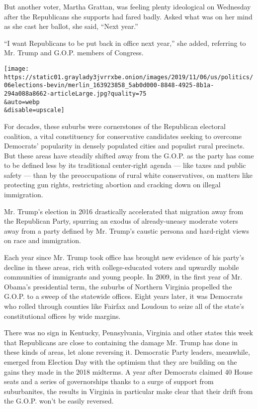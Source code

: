 But another voter, Martha Grattan, was feeling plenty ideological on
Wednesday after the Republicans she supports had fared badly. Asked what
was on her mind as she cast her ballot, she said, ``Next year.''

``I want Republicans to be put back in office next year,'' she added,
referring to Mr. Trump and G.O.P. members of Congress.

\texttt{[image: https://static01.graylady3jvrrxbe.onion/images/2019/11/06/us/politics/06elections-bevin/merlin\_163923858\_5ab0d000-8848-4925-8b1a-294a088a8662-articleLarge.jpg?quality=75\\\&auto=webp\\\&disable=upscale]}

For decades, these suburbs were cornerstones of the Republican electoral
coalition, a vital constituency for conservative candidates seeking to
overcome Democrats' popularity in densely populated cities and populist
rural precincts. But these areas have steadily shifted away from the
G.O.P. as the party has come to be defined less by its traditional
center-right agenda --- like taxes and public safety --- than by the
preoccupations of rural white conservatives, on matters like protecting
gun rights, restricting abortion and cracking down on illegal
immigration.

Mr. Trump's election in 2016 drastically accelerated that migration away
from the Republican Party, spurring an exodus of already-uneasy moderate
voters away from a party defined by Mr. Trump's caustic persona and
hard-right views on race and immigration.

Each year since Mr. Trump took office has brought new evidence of his
party's decline in these areas, rich with college-educated voters and
upwardly mobile communities of immigrants and young people. In 2009, in
the first year of Mr. Obama's presidential term, the suburbs of Northern
Virginia propelled the G.O.P. to a sweep of the statewide offices. Eight
years later, it was Democrats who rolled through counties like Fairfax
and Loudoun to seize all of the state's constitutional offices by wide
margins.

There was no sign in Kentucky, Pennsylvania, Virginia and other states
this week that Republicans are close to containing the damage Mr. Trump
has done in these kinds of areas, let alone reversing it. Democratic
Party leaders, meanwhile, emerged from Election Day with the optimism
that they are building on the gains they made in the 2018 midterms. A
year after Democrats claimed 40 House seats and a series of
governorships thanks to a surge of support from suburbanites, the
results in Virginia in particular make clear that their drift from the
G.O.P. won't be easily reversed.

